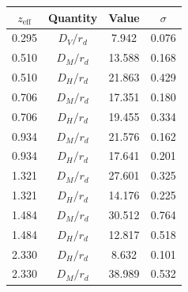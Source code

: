 \begin{tabular}{cccc}
\toprule
$z_\mathrm{eff}$ & Quantity & Value & $\sigma$ \\
\midrule
0.295 & $D_V/r_d$ & 7.942 & 0.076 \\
0.510 & $D_M/r_d$ & 13.588 & 0.168 \\
0.510 & $D_H/r_d$ & 21.863 & 0.429 \\
0.706 & $D_M/r_d$ & 17.351 & 0.180 \\
0.706 & $D_H/r_d$ & 19.455 & 0.334 \\
0.934 & $D_M/r_d$ & 21.576 & 0.162 \\
0.934 & $D_H/r_d$ & 17.641 & 0.201 \\
1.321 & $D_M/r_d$ & 27.601 & 0.325 \\
1.321 & $D_H/r_d$ & 14.176 & 0.225 \\
1.484 & $D_M/r_d$ & 30.512 & 0.764 \\
1.484 & $D_H/r_d$ & 12.817 & 0.518 \\
2.330 & $D_H/r_d$ & 8.632 & 0.101 \\
2.330 & $D_M/r_d$ & 38.989 & 0.532 \\
\bottomrule
\end{tabular}

